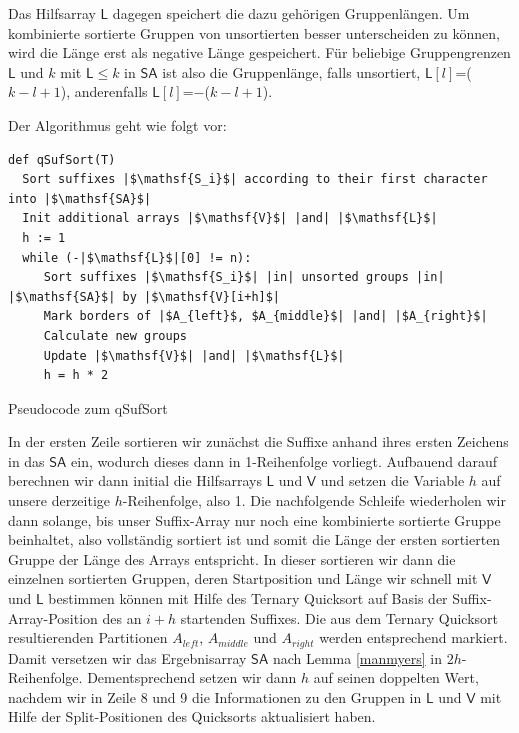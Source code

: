 Das Hilfsarray $\mathsf{L}$ dagegen speichert die dazu gehörigen Gruppenlängen. Um kombinierte sortierte Gruppen von unsortierten besser unterscheiden zu können, wird die Länge erst als negative Länge gespeichert. Für beliebige Gruppengrenzen $\mathsf{L}$ und $k$ mit $\mathsf{L} \leq k$ in $\mathsf{SA}$ ist also die Gruppenlänge, falls unsortiert, $\mathsf{L}[l]$=($k-l+1$), anderenfalls $\mathsf{L}[l]$=$-$($k-l+1$). 

Der Algorithmus geht wie folgt vor:


\begin{listing}
\begin{verbatim}
def qSufSort(T)
  Sort suffixes |$\mathsf{S_i}$| according to their first character into |$\mathsf{SA}$|  
  Init additional arrays |$\mathsf{V}$| |and| |$\mathsf{L}$|
  h := 1
  while (-|$\mathsf{L}$|[0] != n):
     Sort suffixes |$\mathsf{S_i}$| |in| unsorted groups |in| |$\mathsf{SA}$| by |$\mathsf{V}[i+h]$| 
     Mark borders of |$A_{left}$, $A_{middle}$| |and| |$A_{right}$|
     Calculate new groups 
     Update |$\mathsf{V}$| |and| |$\mathsf{L}$|
     h = h * 2
\end{verbatim}
\caption{Pseudocode zum qSufSort}
\end{listing}


In der ersten Zeile sortieren wir zunächst die Suffixe anhand ihres ersten Zeichens in das $\mathsf{SA}$ ein, wodurch dieses dann in 1-Reihenfolge vorliegt. Aufbauend darauf berechnen wir dann initial die Hilfsarrays $\mathsf{L}$ und $\mathsf{V}$ und setzen die Variable $h$ auf unsere derzeitige $h$-Reihenfolge, also 1.
Die nachfolgende Schleife wiederholen wir dann solange, bis unser Suffix-Array nur noch eine kombinierte sortierte Gruppe beinhaltet, also vollständig sortiert ist und somit die Länge der ersten sortierten Gruppe der Länge des Arrays entspricht.
In dieser sortieren wir dann die einzelnen sortierten Gruppen, deren Startposition und Länge wir schnell mit $\mathsf{V}$ und $\mathsf{L}$ bestimmen können mit Hilfe des Ternary Quicksort auf Basis der Suffix-Array-Position des an $i+h$ startenden Suffixes. Die aus dem Ternary Quicksort resultierenden Partitionen $A_{left}$, $A_{middle}$ und $A_{right}$ werden entsprechend markiert. Damit versetzen wir das Ergebnisarray $\mathsf{SA}$ nach Lemma \ref{manmyers} in $2h$-Reihenfolge. Dementsprechend setzen wir dann $h$ auf seinen doppelten Wert, nachdem wir in Zeile 8 und 9 die Informationen zu den Gruppen in $\mathsf{L}$ und $\mathsf{V}$ mit Hilfe der Split-Positionen des Quicksorts aktualisiert haben.

